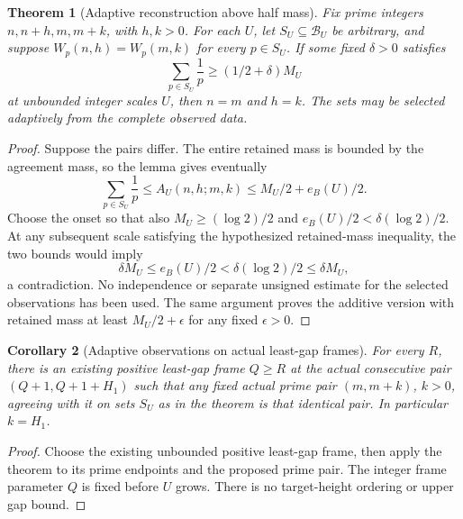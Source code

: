 \documentclass[11pt]{article}
\newtheorem{theorem}{Theorem}[section]
\newtheorem{corollary}[theorem]{Corollary}
\begin{document}
\begin{theorem}[Adaptive reconstruction above half mass]
\label{thm:native-half-inverse}
Fix prime integers \(n,n+h,m,m+k\), with \(h,k>0\).
For each \(U\), let \(S_U\subseteq\mathcal B_U\) be arbitrary, and
suppose \(W_p(n,h)=W_p(m,k)\) for every \(p\in S_U\).
If some fixed \(\delta>0\) satisfies
\[
 \sum_{p\in S_U}\frac1p\ge(1/2+\delta)M_U
\]
at unbounded integer scales \(U\), then \(n=m\) and \(h=k\).
The sets may be selected adaptively from the complete observed data.
\end{theorem}
\begin{proof}
Suppose the pairs differ. The entire retained mass is bounded by
the agreement mass, so the lemma gives eventually
\[
 \sum_{p\in S_U}\frac1p
                \le A_U(n,h;m,k)
                \le M_U/2+e_B(U)/2.
\]
Choose the onset so that also \(M_U\ge(\log2)/2\) and
\(e_B(U)/2<\delta(\log2)/2\). At any subsequent scale satisfying the
hypothesized retained-mass inequality, the two bounds would imply
\[
 \delta M_U\le e_B(U)/2
                   <\delta(\log2)/2\le\delta M_U,
\]
a contradiction. No independence or separate unsigned estimate for
the selected observations has been used. The same argument proves
the additive version with retained mass at least \(M_U/2+\epsilon\)
for any fixed \(\epsilon>0\).
\end{proof}

\begin{corollary}[Adaptive observations on actual least-gap frames]
\label{cor:native-half-least-gap}
For every \(R\), there is an existing positive least-gap frame
\(Q\ge R\) at the actual consecutive pair
\((Q+1,Q+1+H_1)\) such that any fixed actual prime pair
\((m,m+k)\), \(k>0\), agreeing with it on sets \(S_U\) as in the
theorem is that identical pair. In particular \(k=H_1\).
\end{corollary}
\begin{proof}
Choose the existing unbounded positive least-gap frame, then apply
the theorem to its prime endpoints and the proposed prime pair.
The integer frame parameter \(Q\) is fixed before \(U\) grows.
There is no target-height ordering or upper gap bound.
\end{proof}
\end{document}
